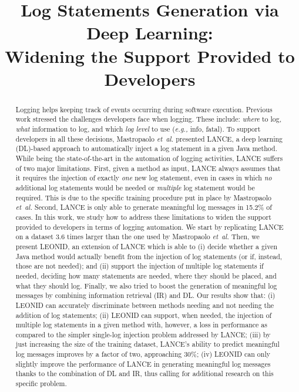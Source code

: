 \documentclass[10pt,conference]{IEEEtran}
\newcommand{\eg}{\emph{e.g.,}\xspace}
\newcommand{\etal}{\emph{et~al.}\xspace}
\newcommand{\approach}{LEONID\xspace} %
\begin{document}
\title{Log Statements Generation via Deep Learning:\\Widening the Support Provided to Developers\vspace{-1cm}}


\maketitle

\begin{abstract}
Logging helps keeping track of events occurring during software execution. Previous work stressed the challenges developers face when logging. These include: \emph{where} to log, \emph{what} information to log, and which \emph{log level} to use (\eg info, fatal). To support developers in all these decisions, Mastropaolo \etal presented LANCE, a deep learning (DL)-based approach to automatically inject a log statement in a given Java method. While being the state-of-the-art in the automation of logging activities, LANCE suffers of two major limitations. First, given a method as input, LANCE always assumes that it requires the injection of exactly \emph{one} new log statement, even in cases in which \emph{no} additional log statements would be needed or \emph{multiple} log statement would be required. This is due to the specific training procedure put in place by Mastropaolo \etal Second, LANCE is only able to generate meaningful log messages in 15.2\% of cases. In this work, we study how to address these limitations to widen the support provided to developers in terms of logging automation. We start by replicating LANCE on a dataset 3.6 times larger than the one used by Mastropaolo \etal Then, we present \approach, an extension of LANCE which is able to (i) decide whether a given Java method would actually benefit from the injection of log statements (or if, instead, those are not needed); and (ii) support the injection of multiple log statements if needed, deciding how many statements are needed, where they should be placed, and what they should log. Finally, we also tried to boost the generation of meaningful log messages by combining information retrieval (IR) and DL. Our results show that: (i) \approach can accurately discriminate between methods needing and not needing the addition of log statements; (ii) \approach can support, when needed, the injection of multiple log statements in a given method with, however, a loss in performance as compared to the simpler single-log injection problem addressed by LANCE; (iii) by just increasing the size of the training dataset, LANCE's ability to predict meaningful log messages improves by a factor of two, approaching 30\%; (iv) \approach can only slightly improve the performance of LANCE in generating meaningful log messages thanks to the combination of DL and IR, thus calling for additional research on this specific problem.
\end{abstract}
\end{document}
